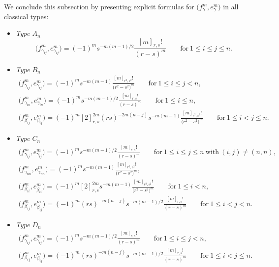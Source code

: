 \documentclass[pdftex]{sigma}
\numberwithin{equation}{section}
\begin{document}
We conclude this subsection by presenting explicit formulas for $\bigl(f_{\gamma}^{m},e_{\gamma}^{m}\bigr)$ in all classical types:
\begin{itemize}\itemsep=0pt
\item
\emph{Type $A_{n}$}
\begin{equation}\label{eq:A-parity-constants}
 \bigl(f_{\gamma_{ij}}^{m},e_{\gamma_{ij}}^{m}\bigr) = (-1)^{m}s^{-m(m-1)/2}\frac{[m]_{r,s}!}{(r - s)^{m}}
 \qquad \mathrm{for} \ 1 \le i \le j \le n.
\end{equation}

\item
\emph{Type $B_{n}$}
\begin{gather}
 \bigl(f_{\gamma_{ij}}^{m},e_{\gamma_{ij}}^{m}\bigr) = (-1)^{m}s^{-m(m - 1)}\frac{[m]_{r^{2},s^{2}}!}{\bigl(r^{2} - s^{2}\bigr)^{m}}
 \qquad \mathrm{for} \ 1 \le i \le j < n, \nonumber\\
 \bigl(f_{\gamma_{in}}^{m},e_{\gamma_{in}}^{m}\bigr) = (-1)^{m}s^{-m(m-1)/2}\frac{[m]_{r,s}!}{(r - s)^{m}}
 \qquad \mathrm{for} \ 1 \le i \le n,\label{eq:B-parity-constants}\\
 \bigl(f_{\beta_{ij}}^{m},e_{\beta_{ij}}^{m}\bigr) =
 (-1)^{m}[2]_{r,s}^{2m}(rs)^{-2m(n - j)}s^{-m(m - 1)}\frac{[m]_{r^{2},s^{2}}!}{\bigl(r^{2} - s^{2}\bigr)^{m}}
 \qquad \mathrm{for} \ 1 \le i < j \le n.\nonumber
\end{gather}

\item
\emph{Type $C_{n}$}
\begin{gather}
 \bigl(f_{\gamma_{ij}}^{m},e_{\gamma_{ij}}^{m}\bigr) = (-1)^{m}s^{-m(m - 1)/2}\frac{[m]_{r,s}!}{(r - s)^{m}}
 \qquad \mathrm{for} \ 1 \le i \le j \le n \ \mathrm{with} \ (i,j) \neq (n,n),\nonumber \\
 \bigl(f_{\gamma_{nn}}^{m},e_{\gamma_{nn}}^{m}\bigr) = (-1)^{m}s^{-m(m - 1)}\frac{[m]_{r^{2},s^{2}}!}{\bigl(r^{2} - s^{2}\bigr)^{m}},\nonumber \\
 \bigl(f_{\beta_{ii}}^{m},e_{\beta_{ii}}^{m}\bigr) =
 (-1)^{m}[2]_{r,s}^{2m}s^{-m(m - 1)}\frac{[m]_{r^{2},s^{2}}!}{\bigl(r^{2} - s^{2}\bigr)^{m}}
 \qquad \mathrm{for} \ 1 \le i < n,\nonumber\\
 \bigl(f_{\beta_{ij}}^{m},e_{\beta_{ij}}^{m}\bigr) = (-1)^{m}(rs)^{-m(n - j)}s^{-m(m - 1)/2}\frac{[m]_{r,s}!}{(r - s)^{m}}
 \qquad \mathrm{for} \ 1 \le i < j < n.\label{eq:C-parity-constants}
\end{gather}

\item
\emph{Type $D_{n}$}
\begin{gather}
 \bigl(f_{\gamma_{ij}}^{m},e_{\gamma_{ij}}^{m}\bigr) = (-1)^{m}s^{-m(m - 1)/2}\frac{[m]_{r,s}!}{(r - s)^{m}}
 \qquad \mathrm{for} \ 1 \le i \le j < n, \nonumber\\
 \bigl(f_{\beta_{ij}}^{m},e_{\beta_{ij}}^{m}\bigr) = (-1)^{m}(rs)^{-m(n - j)}s^{-m(m - 1)/2}\frac{[m]_{r,s}!}{(r - s)^{m}}
 \qquad \mathrm{for} \ 1 \le i < j \le n.\label{eq:D-parity-constants}
\end{gather}
\end{itemize}
\end{document}
